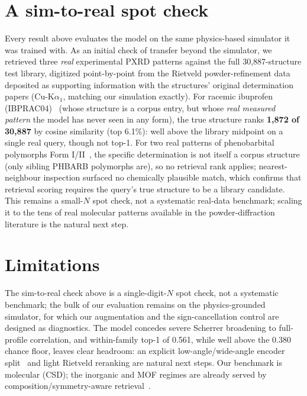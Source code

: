 \documentclass[conference]{IEEEtran}
\begin{document}
\section{A sim-to-real spot check}\label{sec:realcheck}
Every result above evaluates the model on the same physics-based simulator it was
trained with. As an initial check of transfer beyond the simulator, we retrieved
three \emph{real} experimental PXRD patterns against the full 30{,}887-structure
test library, digitized point-by-point from the Rietveld powder-refinement data
deposited as supporting information with the structures' original
determination papers (Cu-K$\alpha_1$, matching our simulation exactly). For
racemic ibuprofen (IBPRAC04)~\cite{derollez2010ibuprofen} (whose structure is a
corpus entry, but whose \emph{real measured pattern} the model has never seen in
any form), the true structure ranks \textbf{1{,}872 of 30{,}887} by cosine
similarity (top 6.1\%): well above the library midpoint on a single real query,
though not top-1. For two real patterns of phenobarbital polymorphs Form
I/II~\cite{platteau2005phenobarbital}, the specific determination is not itself a
corpus structure (only sibling PHBARB polymorphs are), so no retrieval rank
applies; nearest-neighbour inspection surfaced no chemically plausible match,
which confirms that retrieval scoring requires the query's true structure to be a
library candidate. This remains a small-$N$ spot check, not a systematic real-data
benchmark; scaling it to the tens of real molecular patterns available in the
powder-diffraction literature is the natural next step.

\section{Limitations}
The sim-to-real check above is a single-digit-$N$ spot check, not a systematic
benchmark; the bulk of our evaluation remains on the physics-grounded simulator,
for which our augmentation and the sign-cancellation control are designed as
diagnostics. The model concedes severe Scherrer broadening to full-profile
correlation, and within-family top-1 of 0.561, while well above the 0.380 chance
floor, leaves clear headroom: an explicit low-angle/wide-angle encoder
split~\cite{xu2025xccp} and light Rietveld reranking are natural next steps. Our
benchmark is molecular (CSD); the inorganic and MOF regimes are already served by
composition/symmetry-aware retrieval~\cite{xu2025xccp,lai2025xtalnet}.
\end{document}
